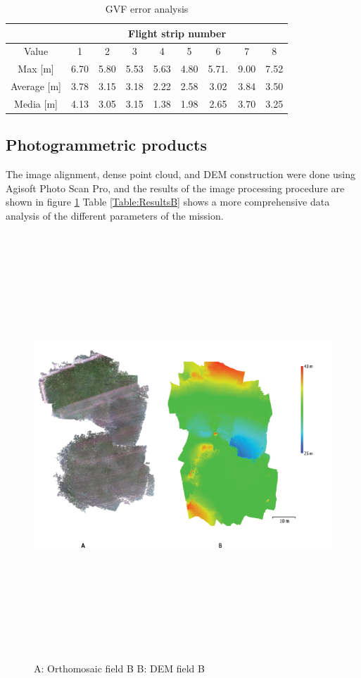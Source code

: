 \begin{table}[H]
\centering
\begin{tabular}{|c|c|c|c|c|c|c|c|c|}
\hline
                & \multicolumn{8}{c|}{Flight strip number}               \\ \hline
Value           & 1    & 2    & 3    & 4    & 5    & 6     & 7    & 8    \\ \hline
Max {[}m{]}     & 6.70 & 5.80 & 5.53 & 5.63 & 4.80 & 5.71. & 9.00 & 7.52 \\ \hline
Average {[}m{]} & 3.78 & 3.15 & 3.18 & 2.22 & 2.58 & 3.02  & 3.84 & 3.50 \\ \hline
Media {[}m{]}   & 4.13 & 3.05 & 3.15 & 1.38 & 1.98 & 2.65  & 3.70 & 3.25 \\ \hline
\end{tabular}
\caption{GVF error analysis}
\label{Table:errorGVF}
\end{table}

\subsection{Photogrammetric products}
The image alignment, dense point cloud, and DEM construction were done using Agisoft Photo Scan Pro, and the results of the image processing procedure are shown in figure \ref{fig:ResultBprocessing} Table \ref{Table:ResultsB} shows a more comprehensive data analysis of the different parameters of the mission.
\begin{figure}[H]
\centering
\includegraphics[width=16cm,height=16cm,keepaspectratio]{imagenes/ResutsB.png}
\caption{ A: Orthomosaic field B B: DEM field B}
\label{fig:ResultBprocessing}
\end{figure}

